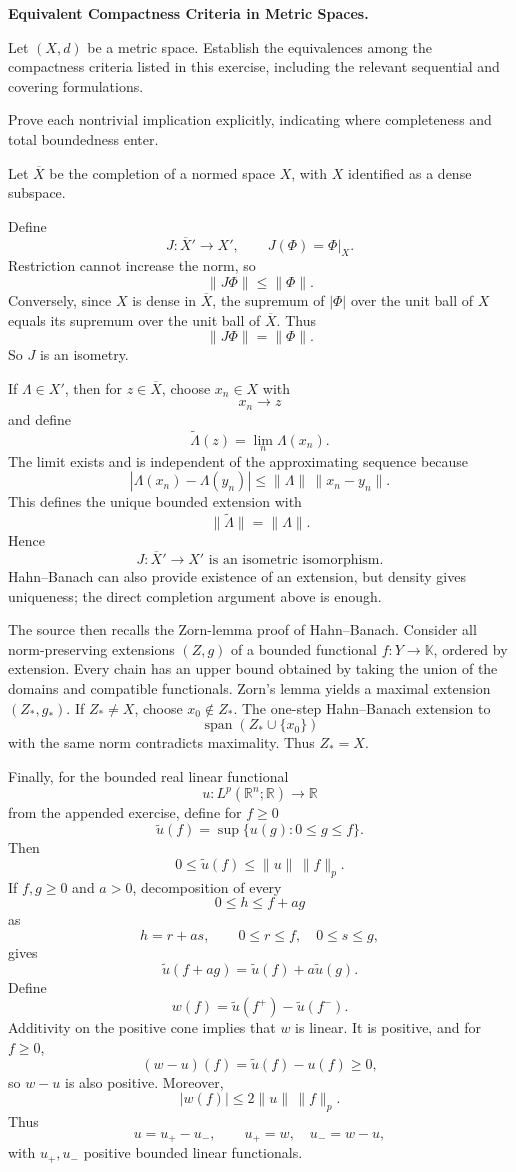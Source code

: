 \begin{problem}[CP-II-0348]
\label{prob:cp-ii-0348}
\textbf{Equivalent Compactness Criteria in Metric Spaces.}

\hspace*{1.5em}Let \((X,d)\) be a metric space. Establish the equivalences among the
compactness criteria listed in this exercise, including the relevant
sequential and covering formulations.

Prove each nontrivial implication explicitly, indicating where completeness
and total boundedness enter.
\end{problem}

\begin{solution}
Let \(\overline X\) be the completion of a normed space \(X\), with \(X\) identified as a
dense subspace.

Define
\[
J:\overline X'\to X',
\qquad
J(\Phi)=\Phi|_X.
\]
Restriction cannot increase the norm, so
\[
\|J\Phi\|\le\|\Phi\|.
\]
Conversely, since \(X\) is dense in \(\overline X\), the supremum of \(|\Phi|\) over the unit
ball of \(X\) equals its supremum over the unit ball of \(\overline X\). Thus
\[
\|J\Phi\|=\|\Phi\|.
\]
So \(J\) is an isometry.

If \(\Lambda\in X'\), then for \(z\in\overline X\), choose \(x_n\in X\) with
\[
x_n\to z
\]
and define
\[
\widetilde\Lambda(z)
=
\lim_n\Lambda(x_n).
\]
The limit exists and is independent of the approximating sequence because
\[
|\Lambda(x_n)-\Lambda(y_n)|
\le
\|\Lambda\|\,\|x_n-y_n\|.
\]
This defines the unique bounded extension with
\[
\|\widetilde\Lambda\|=\|\Lambda\|.
\]
Hence
\[
\boxed{
J:\overline X'\to X'
\text{ is an isometric isomorphism}.
}
\]
Hahn--Banach can also provide existence of an extension, but density gives uniqueness; the
direct completion argument above is enough.

The source then recalls the Zorn-lemma proof of Hahn--Banach. Consider all norm-preserving
extensions \((Z,g)\) of a bounded functional \(f:Y\to\mathbb K\), ordered by extension.
Every chain has an upper bound obtained by taking the union of the domains and compatible
functionals. Zorn's lemma yields a maximal extension \((Z_*,g_*)\). If \(Z_*\neq X\), choose
\(x_0\notin Z_*\). The one-step Hahn--Banach extension to
\[
\operatorname{span}(Z_*\cup\{x_0\})
\]
with the same norm contradicts maximality. Thus \(Z_*=X\).

Finally, for the bounded real linear functional
\[
u:L^p(\mathbb R^n;\mathbb R)\to\mathbb R
\]
from the appended exercise, define for \(f\ge0\)
\[
\widetilde u(f)
=
\sup\{u(g):0\le g\le f\}.
\]
Then
\[
0\le\widetilde u(f)\le\|u\|\,\|f\|_p.
\]
If \(f,g\ge0\) and \(a>0\), decomposition of every
\[
0\le h\le f+ag
\]
as
\[
h=r+as,
\qquad
0\le r\le f,\quad
0\le s\le g,
\]
gives
\[
\widetilde u(f+ag)
=
\widetilde u(f)+a\widetilde u(g).
\]
Define
\[
w(f)
=
\widetilde u(f^+)-\widetilde u(f^-).
\]
Additivity on the positive cone implies that \(w\) is linear. It is positive, and for
\(f\ge0\),
\[
(w-u)(f)
=
\widetilde u(f)-u(f)\ge0,
\]
so \(w-u\) is also positive. Moreover,
\[
|w(f)|
\le
2\|u\|\,\|f\|_p.
\]
Thus
\[
\boxed{
u=u_+-u_-,
\qquad
u_+=w,\quad
u_-=w-u,
}
\]
with \(u_+,u_-\) positive bounded linear functionals.
\end{solution}


